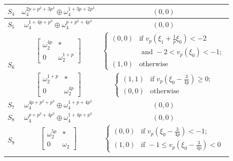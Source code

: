 \documentclass[11pt]{amsart}
\theoremstyle{definition}
\numberwithin{equation}{subsection}
\theoremstyle{plain}
\theoremstyle{plain}
\theoremstyle{plain}
\theoremstyle{plain}
\theoremstyle{plain}
\theoremstyle{plain}
\theoremstyle{plain}
\theoremstyle{plain}
\theoremstyle{plain}
\theoremstyle{plain}
\theoremstyle{plain}
\theoremstyle{plain}
\theoremstyle{definition}
\theoremstyle{definition}
\theoremstyle{definition}
\theoremstyle{remark}
\renewcommand{\(}{\textup{(}}
\renewcommand{\)}{\textup{)}}
\begin{document}
\begin{table}[htbp]
\begin{tabular}{|c||c|c|}
        $S_4$
            & $\omega_4^{2p+p^2+3p^3}\oplus\omega_4^{1+3p+2p^3}$
            & $(0,0)$ \\\hline
        $S_5$
            & $\omega_4^{1+4p+p^3}\oplus\omega_4^{p+p^2+4p^3}$
            & $(0,0)$ \\\hline
        \multirow{2}{*}[-2ex]{$S_6$}
            & $
            \begin{bmatrix}
                \omega_2^{4p} & * \\ 0 & \omega_2^{1+p}
            \end{bmatrix}$
            & $
            \begin{cases}
                (0,0) &\mbox{if } v_p(\xi_1+\frac{1}{p}\xi_0)<-2 \\&\mbox{ and } -2<v_p(\xi_0)<-1;\\
                (1,0) &\mbox{otherwise}
            \end{cases}$ \\\cline{2-3}
            & $
            \begin{bmatrix}
                \omega_2^{1+p} & * \\ 0 & \omega_2^{4p}
            \end{bmatrix}$
            & $
            \begin{cases}
                (1,1) &\mbox{if } v_p(\xi_0-\frac{3}{4p})\geq 0;\\
                (0,0) &\mbox{otherwise}
            \end{cases}$ \\\hline
        $S_7$
            & $\omega_4^{4p+p^2+p^3}\oplus\omega_4^{1+p+4p^3}$
            & $(0,0)$ \\\hline
        $S_8$
            & $\omega_4^{p+p^2+4p^3}\oplus\omega_4^{1+4p+p^3}$
            & $(0,0)$ \\\hline
        \multirow{2}{*}[-1.5ex]{$S_9$}
            & $
            \begin{bmatrix}
                \omega_2^{5p} & * \\ 0 & \omega_2
            \end{bmatrix}$
            & $
            \begin{cases}
                (0,0) &\mbox{if } v_p(\xi_0-\frac{3}{4p})<-1;\\
                (1,0) &\mbox{if } -1\leq v_p(\xi_0-\frac{3}{4p})<0
            \end{cases}$ \\\cline{2-3}

\end{tabular}
\end{table}
\end{document}
